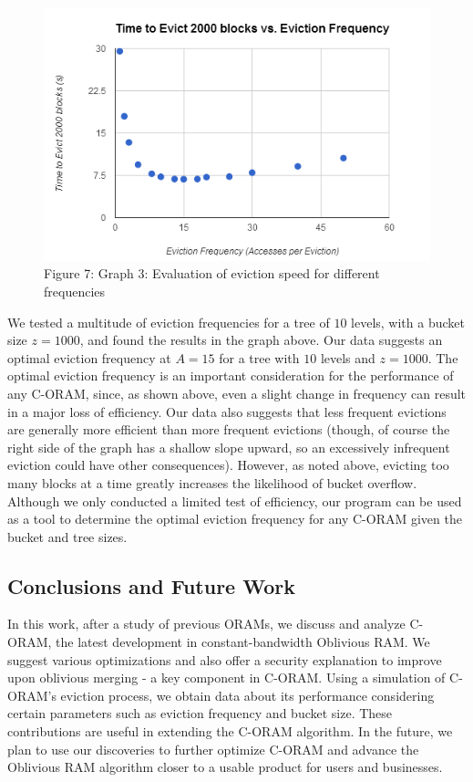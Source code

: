 \documentclass[12pt, oneside]{article}   	%
\begin{document}
\begin{figure}[H]
  \includegraphics[width=\linewidth]{evictionfreqgraph}
  \caption{Figure 7: Graph 3: Evaluation of eviction speed for different frequencies}
  \label{fig:evictionfreqgraph}
\end{figure}


We tested a multitude of eviction frequencies for a tree of $10$ levels, with a bucket size $z = 1000$, and found the results in the graph above. Our data suggests an optimal eviction frequency at $A=15$ for a tree with $10$ levels and $z = 1000$. The optimal eviction frequency is an important consideration for the performance of any C-ORAM, since, as shown above, even a slight change in frequency can result in a major loss of efficiency. Our data also suggests that less frequent evictions are generally more efficient than more frequent evictions (though, of course the right side of the graph has a shallow slope upward, so an excessively infrequent eviction could have other consequences). However, as noted above, evicting too many blocks at a time greatly increases the likelihood of bucket overflow. Although we only conducted a limited test of efficiency, our program can be used as a tool to determine the optimal eviction frequency for any C-ORAM given the bucket and tree sizes.

\subsection{Conclusions and Future Work}
In this work, after a study of previous ORAMs, we discuss and analyze C-ORAM, the latest development in constant-bandwidth Oblivious RAM. We suggest various optimizations and also offer a security explanation to improve upon oblivious merging - a key component in C-ORAM. Using a simulation of C-ORAM's eviction process, we obtain data about its performance considering certain parameters such as eviction frequency and bucket size. These contributions are useful in extending the C-ORAM algorithm. In the future, we plan to use our discoveries to further optimize C-ORAM and advance the Oblivious RAM algorithm closer to a usable product for users and businesses.




\end{document}
